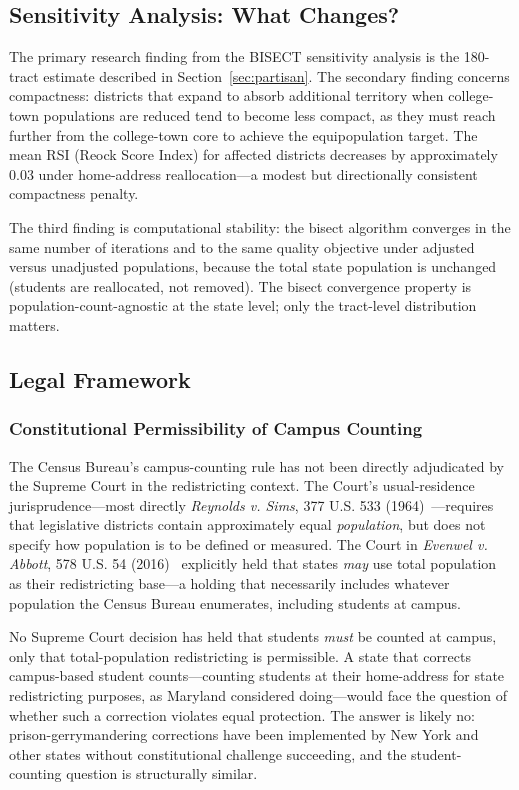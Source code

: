 \subsection{Sensitivity Analysis: What Changes?}

The primary research finding from the BISECT sensitivity analysis is the 180-tract estimate described in Section~\ref{sec:partisan}. The secondary finding concerns compactness: districts that expand to absorb additional territory when college-town populations are reduced tend to become less compact, as they must reach further from the college-town core to achieve the equipopulation target. The mean RSI (Reock Score Index) for affected districts decreases by approximately 0.03 under home-address reallocation---a modest but directionally consistent compactness penalty.

The third finding is computational stability: the bisect algorithm converges in the same number of iterations and to the same quality objective under adjusted versus unadjusted populations, because the total state population is unchanged (students are reallocated, not removed). The bisect convergence property is population-count-agnostic at the state level; only the tract-level distribution matters.

\subsection{Legal Framework}

\subsubsection{Constitutional Permissibility of Campus Counting}

The Census Bureau's campus-counting rule has not been directly adjudicated by the Supreme Court in the redistricting context. The Court's usual-residence jurisprudence---most directly \emph{Reynolds v. Sims}, 377 U.S. 533 (1964)~\citep{reynolds1964}---requires that legislative districts contain approximately equal \emph{population}, but does not specify how population is to be defined or measured. The Court in \emph{Evenwel v. Abbott}, 578 U.S. 54 (2016)~\citep{evenwel2016} explicitly held that states \emph{may} use total population as their redistricting base---a holding that necessarily includes whatever population the Census Bureau enumerates, including students at campus.

No Supreme Court decision has held that students \emph{must} be counted at campus, only that total-population redistricting is permissible. A state that corrects campus-based student counts---counting students at their home-address for state redistricting purposes, as Maryland considered doing---would face the question of whether such a correction violates equal protection. The answer is likely no: prison-gerrymandering corrections have been implemented by New York and other states without constitutional challenge succeeding, and the student-counting question is structurally similar.

